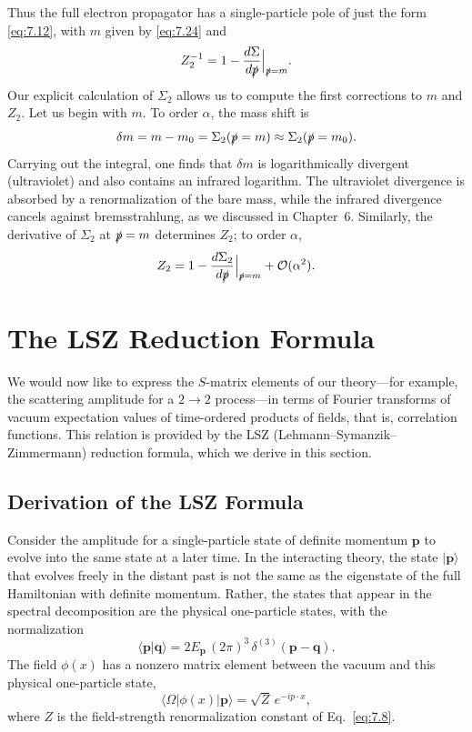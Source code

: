 Thus the full electron propagator has a single-particle pole of just the form
\eqref{eq:7.12}, with $m$ given by \eqref{eq:7.24} and
\begin{equation}
  Z_2^{-1} = 1 - \frac{d\Sigma}{d\slashed{p}}\Big|_{\slashed{p}=m} .
  \label{eq:7.26}
\end{equation}
Our explicit calculation of $\Sigma_2$ allows us to compute the first
corrections to $m$ and $Z_2$.  Let us begin with $m$.  To order $\alpha$, the
mass shift is
\begin{equation}
  \delta m = m - m_0 = \Sigma_2(\slashed{p}=m) \approx \Sigma_2(\slashed{p}=m_0) .
  \label{eq:7.27}
\end{equation}
Carrying out the integral, one finds that $\delta m$ is logarithmically
divergent (ultraviolet) and also contains an infrared logarithm.  The
ultraviolet divergence is absorbed by a renormalization of the bare mass,
while the infrared divergence cancels against bremsstrahlung, as we discussed
in Chapter~6.  Similarly, the derivative of $\Sigma_2$ at
$\slashed{p} = m$ determines $Z_2$; to order $\alpha$,
\begin{equation}
  Z_2 = 1 - \frac{d\Sigma_2}{d\slashed{p}}\Big|_{\slashed{p}=m}
    + \mathcal{O}(\alpha^2) .
  \label{eq:7.29}
\end{equation}

\section{The LSZ Reduction Formula}

We would now like to express the $S$-matrix elements of our theory---for
example, the scattering amplitude for a $2\to2$ process---in terms of
Fourier transforms of vacuum expectation values of time-ordered products of
fields, that is, correlation functions.  This relation is provided by the LSZ
(Lehmann--Symanzik--Zimmermann) reduction formula, which we derive in this
section.%

\subsection*{Derivation of the LSZ Formula}

Consider the amplitude for a single-particle state of definite momentum
$\mathbf{p}$ to evolve into the same state at a later time.  In the
interacting theory, the state $|\mathbf{p}\rangle$ that evolves freely in the
distant past is not the same as the eigenstate of the full Hamiltonian with
definite momentum.  Rather, the states that appear in the spectral
decomposition are the physical one-particle states, with the normalization
\begin{equation}
  \langle\mathbf{p}|\mathbf{q}\rangle = 2E_{\mathbf{p}}\,(2\pi)^3\,
    \delta^{(3)}(\mathbf{p}-\mathbf{q}) .
\end{equation}
The field $\phi(x)$ has a nonzero matrix element between the vacuum and this
physical one-particle state,
\begin{equation}
  \langle\Omega|\phi(x)|\mathbf{p}\rangle = \sqrt{Z}\,
    e^{-ip\cdot x},
  \label{eq:7.35}
\end{equation}
where $Z$ is the field-strength renormalization constant of
Eq.~\eqref{eq:7.8}.

